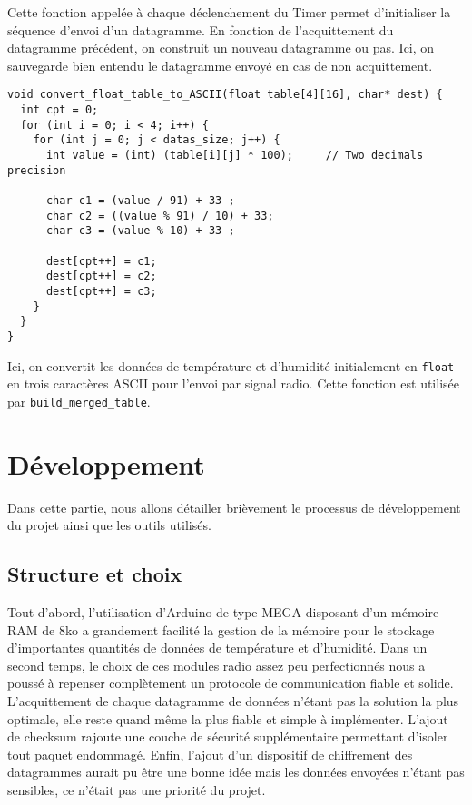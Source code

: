 \documentclass[a4paper]{article}
\begin{document}
Cette fonction appelée à chaque déclenchement du Timer permet d'initialiser la séquence d'envoi d'un datagramme. 
En fonction de l'acquittement du datagramme précédent, on construit un nouveau datagramme ou pas. 
Ici, on sauvegarde bien entendu le datagramme envoyé en cas de non acquittement. 

\begin{lstlisting}
void convert_float_table_to_ASCII(float table[4][16], char* dest) {
  int cpt = 0; 
  for (int i = 0; i < 4; i++) {
    for (int j = 0; j < datas_size; j++) {
      int value = (int) (table[i][j] * 100);     // Two decimals precision

      char c1 = (value / 91) + 33 ;
      char c2 = ((value % 91) / 10) + 33;
      char c3 = (value % 10) + 33 ; 

      dest[cpt++] = c1; 
      dest[cpt++] = c2; 
      dest[cpt++] = c3; 
    }
  }
}
\end{lstlisting}

Ici, on convertit les données de température et d'humidité initialement en \texttt{float} en trois caractères 
ASCII pour l'envoi par signal radio. Cette fonction est utilisée par \texttt{build\_merged\_table}. 




\section{Développement}

Dans cette partie, nous allons détailler brièvement le processus de développement du projet ainsi que les outils 
utilisés. 

\subsection{Structure et choix}

Tout d'abord, l'utilisation d'Arduino de type MEGA disposant d'un mémoire RAM de 8ko a grandement facilité 
la gestion de la mémoire pour le stockage d'importantes quantités de données de température et d'humidité. 
Dans un second temps, le choix de ces modules radio assez peu perfectionnés nous a poussé à repenser complètement 
un protocole de communication fiable et solide. L'acquittement de chaque datagramme de données n'étant pas la solution 
la plus optimale, elle reste quand même la plus fiable et simple à implémenter. 
L'ajout de checksum rajoute une couche de sécurité supplémentaire permettant d'isoler tout paquet endommagé. 
Enfin, l'ajout d'un dispositif de chiffrement des datagrammes aurait pu être une bonne idée mais les données envoyées 
n'étant pas sensibles, ce n'était pas une priorité du projet. 
\end{document}
